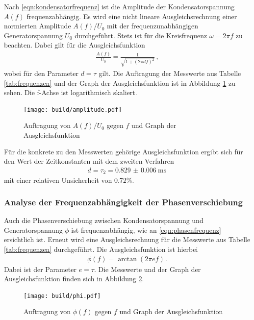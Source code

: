 Nach \eqref{eqn:kondensatorfrequenz} ist die Amplitude der Kondensatorspannung
$A(f)$ frequenzabhängig. Es wird eine nicht lineare Ausgleichsrechnung
einer normierten Amplitude $A(f)/U_0$ mit der frequenzunabhängigen Generatorspannung $U_0$
durchgeführt. Stets ist für die Kreisfrequenz $\omega = 2πf$ zu beachten.
Dabei gilt für die Ausgleichsfunktion
\begin{align}
  \frac{A(f)}{U_0} = \frac{1}{\sqrt{1+(2πdf)^2}}\,,
\end{align}
wobei für den Parameter $d = \tau$ gilt.
Die Auftragung der Messwerte aus Tabelle \ref{tab:frequenzen} und der Graph der Ausgleichsfunktion ist in Abbildung \ref{fig:amplitude}
zu sehen. Die f-Achse ist logarithmisch skaliert.

\begin{figure}
  \centering
  \texttt{[image: build/amplitude.pdf]}
  \caption{Auftragung von $A(f)/U_0$ gegen $f$ und Graph der Ausgleichsfunktion}
  \label{fig:amplitude}
\end{figure}

Für die konkrete zu den Messwerten gehörige Ausgleichsfunktion ergibt sich für den Wert der Zeitkonstanten mit dem zweiten Verfahren
\begin{align}
  d = \tau_2 = \SI{0.829(0006)}{\milli\second}\,
\end{align}
mit einer relativen Unsicherheit von 0.72\%.

\subsubsection{Analyse der Frequenzabhängigkeit der Phasenverschiebung}

Auch die Phasenverschiebung zwischen Kondensatorspannung und Generatorspannung $\phi$
ist frequenzabhängig, wie an \eqref{eqn:phasenfrequenz} ersichtlich ist.
Erneut wird eine Ausgleichsrechnung für die Messwerte aus Tabelle \ref{tab:frequenzen}
durchgeführt. Die Ausgleichsfunktion ist hierbei
\begin{align}
  \phi(f) = \arctan(2πef)\,.
\end{align}
Dabei ist der Parameter $e = \tau$. Die Messwerte und der Graph der Ausgleichsfunktion finden sich
in Abbildung \ref{fig:phiplot}.

\begin{figure}
  \centering
  \texttt{[image: build/phi.pdf]}
  \caption{Auftragung von $\phi(f)$ gegen $f$ und Graph der Ausgleichsfunktion}
  \label{fig:phiplot}
\end{figure}

